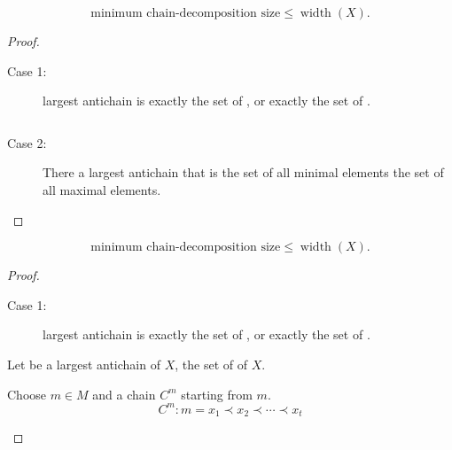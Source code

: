 \begin{frame}{}
  \begin{lemma}
    \[
      \text{minimum chain-decomposition size} \le \operatorname{width}(X).
    \]
  \end{lemma}

  \begin{proof}
    \begin{description}
      \item[Case 1:]
         largest antichain is
        exactly the set of ,
        or exactly the set of .
    \end{description}

      \begin{columns}
      \end{columns}

    \begin{description}
      \item[Case 2:]
        There  a largest antichain
        that is  the set of all minimal elements
         the set of all maximal elements.
    \end{description}
  \end{proof}
\end{frame}

\begin{frame}{}
  \begin{lemma}
    \[
      \text{minimum chain-decomposition size} \le \operatorname{width}(X).
    \]
  \end{lemma}

  \begin{proof}
    \begin{description}
      \item[Case 1:]
         largest antichain is
        exactly the set of ,
        or exactly the set of .
    \end{description}

      \pause
    \begin{center}
      Let  be a largest antichain of $X$,
      the set of  of $X$.

      \pause
      \vspace{0.30cm}
      Choose $m \in M$ and a  chain $C^{m}$ starting from $m$.
      \[
        C^{m}: m = x_{1} \prec x_{2} \prec \cdots \prec x_{t}
      \]
    \end{center}
  \end{proof}
\end{frame}

